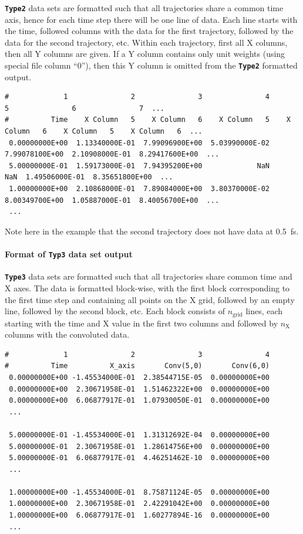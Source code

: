 \documentclass[a4paper,10pt,DIV=15,openany,twoside=false]{scrbook}
\newcommand{\ttt}[1]{\textbf{\texttt{#1}}}
\newenvironment{example}{
  \setlength{\OuterFrameSep}{3pt}
  \vspace{0mm}
  \definecolor{shadecolor}{HTML}{E4F4FF}
  \begin{shaded}
}{
  \end{shaded}
}
\begin{document}
\ttt{Type2} data sets are formatted such that all trajectories share a common time axis, hence for each time step there will be one line of data.
Each line starts with the time, followed columns with the data for the first trajectory, followed by the data for the second trajectory, etc.
Within each trajectory, first all X columns, then all Y columns are given. If a Y column contains only unit weights (using special file column ``0''), then this Y column is omitted from the \ttt{Type2} formatted output.
\begin{example}
\footnotesize\begin{verbatim}
#             1               2               3               4               5               6               7  ...
#          Time    X Column   5    X Column   6    X Column   5    X Column   6    X Column   5    X Column   6  ...
 0.00000000E+00  1.13340000E-01  7.99096900E+00  5.03990000E-02  7.99078100E+00  2.10908000E-01  8.29417600E+00  ...
 5.00000000E-01  1.59173000E-01  7.94395200E+00             NaN             NaN  1.49506000E-01  8.35651800E+00  ...
 1.00000000E+00  2.10868000E-01  7.89084000E+00  3.80370000E-02  8.00349700E+00  1.05887000E-01  8.40056700E+00  ...
 ...
\end{verbatim}
\end{example}
Note here in the example that the second trajectory does not have data at 0.5~fs.

\paragraph{Format of \ttt{Typ3} data set output}

\ttt{Type3} data sets are formatted such that all trajectories share common time and X axes.
The data is formatted block-wise, with the first block corresponding to the first time step and containing all points on the X grid, followed by an empty line, followed by the second block, etc.
Each block consists of $n_\text{grid}$ lines, each starting with the time and X value in the first two columns and followed by $n_\text{X}$ columns with the convoluted data.
\begin{example}
\footnotesize\begin{verbatim}
#             1               2               3               4 
#          Time          X_axis       Conv(5,0)       Conv(6,0) 
 0.00000000E+00 -1.45534000E-01  2.38544715E-05  0.00000000E+00 
 0.00000000E+00  2.30671958E-01  1.51462322E+00  0.00000000E+00 
 0.00000000E+00  6.06877917E-01  1.07930050E-01  0.00000000E+00 
 ...

 5.00000000E-01 -1.45534000E-01  1.31312692E-04  0.00000000E+00 
 5.00000000E-01  2.30671958E-01  1.28614756E+00  0.00000000E+00 
 5.00000000E-01  6.06877917E-01  4.46251462E-10  0.00000000E+00 
 ...

 1.00000000E+00 -1.45534000E-01  8.75871124E-05  0.00000000E+00 
 1.00000000E+00  2.30671958E-01  2.42291042E+00  0.00000000E+00 
 1.00000000E+00  6.06877917E-01  1.60277894E-16  0.00000000E+00 
 ...
\end{verbatim}
\end{example}
\end{document}
